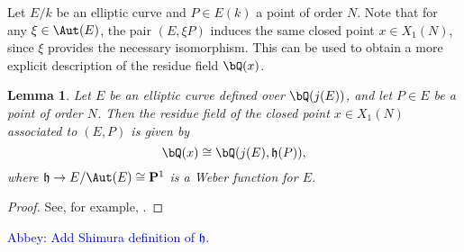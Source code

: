 \documentclass[11pt,reqno]{amsart}
\theoremstyle{plain}
\newtheorem{lemma}[theorem]{Lemma}
\theoremstyle{definition}
\newcommand{\Q}{\bQ}
\newcommand{\abbey}[1]{\textcolor{blue}{Abbey: #1}}
\begin{document}
Let $E/k$ be an elliptic curve and $P \in E(k)$ a point of order $N$. Note that for any $\xi \in \Aut(E)$, the pair $(E,\xi P)$ induces the same closed point $x \in X_1(N)$, since $\xi$ provides the necessary isomorphism. This can be used to obtain a more explicit description of the residue field $\Q(x)$.

\begin{lemma}\label{ResidueFieldLemma}
Let $E$ be an elliptic curve defined over $\Q(j(E))$, and let $P \in E$ be a point of order $N$. Then the residue field of the closed point $x \in X_1(N)$ associated to $(E,P)$ is given by
\[
\Q(x)\cong\Q(j(E),\mathfrak{h}(P)),
\]
where $\mathfrak{h} \rightarrow E/\Aut(E) \cong \mathbf{P}^1$ is a Weber function for $E$. 
\end{lemma}

\begin{proof}
See, for example, \cite[Lemma 2.5]{BourdonNajman2021}.%
\end{proof}

\abbey{Add Shimura definition of $\mathfrak{h}$.}
\end{document}

